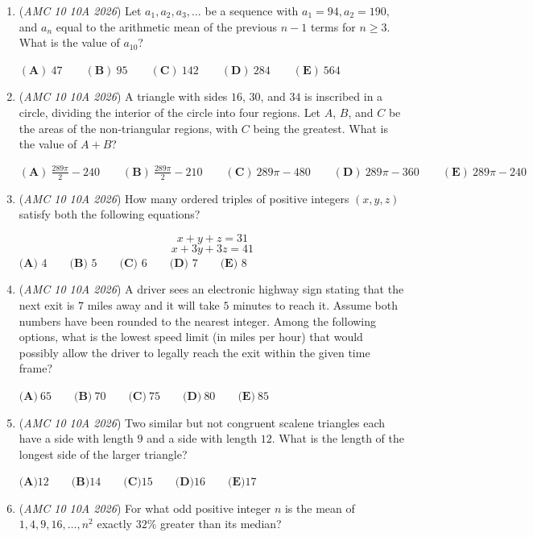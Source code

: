 \begin{enumerate}
	\item (\textit{AMC 10 10A 2026}) Let $a_1,a_2,a_3,\dots$ be a sequence with $a_1=94, a_2=190,$ and $a_n$ equal to the arithmetic mean of the previous $n-1$ terms for $n\geq 3$. What is the value of $a_{10}$?


 $\mathbf{(A)}~47\qquad\mathbf{(B)}~95\qquad\mathbf{(C)}~142\qquad\mathbf{(D)}~284\qquad\mathbf{(E)}~564$


	\item (\textit{AMC 10 10A 2026}) A triangle with sides $16$, $30$, and $34$ is inscribed in a circle, dividing the interior of the circle into four regions. Let $A$, $B$, and $C$ be the areas of the non-triangular regions, with $C$ being the greatest. What is the value of $A+B$?


 $\mathbf{(A)}\ \frac{289\pi}{2}-240 \qquad \mathbf{(B)}\ \frac{289\pi}{2}-210 \qquad \mathbf{(C)}\ 289\pi-480 \qquad \mathbf{(D)}\ 289\pi-360 \qquad \mathbf{(E)}\ 289\pi- 240$


	\item (\textit{AMC 10 10A 2026}) How many ordered triples of positive integers $(x,y,z)$ satisfy both the following equations?


 
 \[x+y+z=31\]
 \[x+3y+3z=41\]
$\textbf{(A) } 4 \qquad\textbf{(B) } 5 \qquad\textbf{(C) } 6 \qquad\textbf{(D) } 7 \qquad\textbf{(E) } 8$


	\item (\textit{AMC 10 10A 2026}) A driver sees an electronic highway sign stating that the next exit is $7$ miles away and it will take $5$ minutes to reach it. Assume both numbers have been rounded to the nearest integer. Among the following options, what is the lowest speed limit (in miles per hour) that would possibly allow the driver to legally reach the exit within the given time frame?


 $\textbf{(A)}\ 65 \qquad \textbf{(B)}\ 70 \qquad \textbf{(C)}\ 75 \qquad \textbf{(D)}\ 80 \qquad \textbf{(E)}\ 85$


	\item (\textit{AMC 10 10A 2026}) Two similar but not congruent scalene triangles each have a side with length $9$ and a side with length $12$. What is the length of the longest side of the larger triangle?


 $\textbf{(A)} 12 \qquad \textbf{(B)} 14 \qquad \textbf{(C)} 15 \qquad \textbf{(D)} 16 \qquad \textbf{(E)} 17$


	\item (\textit{AMC 10 10A 2026}) For what odd positive integer $n$ is the mean of $1, 4, 9, 16, \dots, n^2$ exactly $32\%$ greater than its median?



\end{enumerate}
